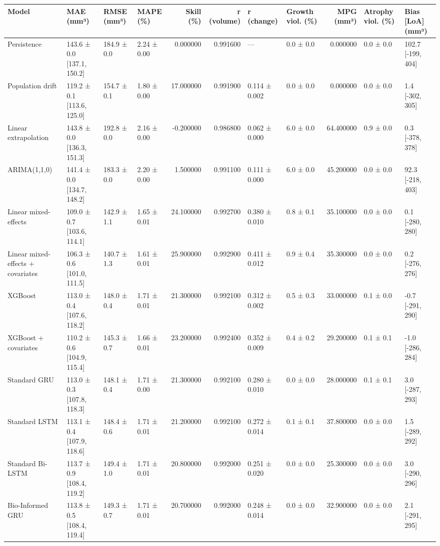 \begin{tabular}{llllrrllrll}
\toprule
Model & MAE (mm³) & RMSE (mm³) & MAPE (\%) & Skill (\%) & r (volume) & r (change) & Growth viol. (\%) & MPG (mm³) & Atrophy viol. (\%) & Bias [LoA] (mm³) \\
\midrule
Persistence & 143.6 ± 0.0 [137.1, 150.2] & 184.9 ± 0.0 & 2.24 ± 0.00 & 0.000000 & 0.991600 & — & 0.0 ± 0.0 & 0.000000 & 0.0 ± 0.0 & 102.7 [-199, 404] \\
Population drift & 119.2 ± 0.1 [113.6, 125.0] & 154.7 ± 0.1 & 1.80 ± 0.00 & 17.000000 & 0.991900 & 0.114 ± 0.002 & 0.0 ± 0.0 & 0.000000 & 0.0 ± 0.0 & 1.4 [-302, 305] \\
Linear extrapolation & 143.8 ± 0.0 [136.3, 151.3] & 192.8 ± 0.0 & 2.16 ± 0.00 & -0.200000 & 0.986800 & 0.062 ± 0.000 & 6.0 ± 0.0 & 64.400000 & 0.9 ± 0.0 & 0.3 [-378, 378] \\
ARIMA(1,1,0) & 141.4 ± 0.0 [134.7, 148.2] & 183.3 ± 0.0 & 2.20 ± 0.00 & 1.500000 & 0.991100 & 0.111 ± 0.000 & 6.0 ± 0.0 & 45.200000 & 0.0 ± 0.0 & 92.3 [-218, 403] \\
Linear mixed-effects & 109.0 ± 0.7 [103.6, 114.1] & 142.9 ± 1.1 & 1.65 ± 0.01 & 24.100000 & 0.992700 & 0.380 ± 0.010 & 0.8 ± 0.1 & 35.100000 & 0.0 ± 0.0 & 0.1 [-280, 280] \\
Linear mixed-effects + covariates & 106.3 ± 0.6 [101.0, 111.5] & 140.7 ± 1.3 & 1.61 ± 0.01 & 25.900000 & 0.992900 & 0.411 ± 0.012 & 0.9 ± 0.4 & 35.300000 & 0.0 ± 0.0 & 0.2 [-276, 276] \\
XGBoost & 113.0 ± 0.4 [107.6, 118.2] & 148.0 ± 0.4 & 1.71 ± 0.01 & 21.300000 & 0.992100 & 0.312 ± 0.002 & 0.5 ± 0.3 & 33.000000 & 0.1 ± 0.0 & -0.7 [-291, 290] \\
XGBoost + covariates & 110.2 ± 0.6 [104.9, 115.4] & 145.3 ± 0.7 & 1.66 ± 0.01 & 23.200000 & 0.992400 & 0.352 ± 0.009 & 0.4 ± 0.2 & 29.200000 & 0.1 ± 0.1 & -1.0 [-286, 284] \\
Standard GRU & 113.0 ± 0.3 [107.8, 118.3] & 148.1 ± 0.4 & 1.71 ± 0.00 & 21.300000 & 0.992100 & 0.280 ± 0.010 & 0.0 ± 0.0 & 28.000000 & 0.1 ± 0.1 & 3.0 [-287, 293] \\
Standard LSTM & 113.1 ± 0.4 [107.9, 118.6] & 148.4 ± 0.6 & 1.71 ± 0.01 & 21.200000 & 0.992100 & 0.272 ± 0.014 & 0.1 ± 0.1 & 37.800000 & 0.0 ± 0.0 & 1.5 [-289, 292] \\
Standard Bi-LSTM & 113.7 ± 0.9 [108.4, 119.2] & 149.4 ± 1.0 & 1.71 ± 0.01 & 20.800000 & 0.992000 & 0.251 ± 0.020 & 0.0 ± 0.0 & 25.300000 & 0.0 ± 0.0 & 3.0 [-290, 296] \\
Bio-Informed GRU & 113.8 ± 0.5 [108.4, 119.4] & 149.3 ± 0.7 & 1.71 ± 0.01 & 20.700000 & 0.992000 & 0.248 ± 0.014 & 0.0 ± 0.0 & 32.900000 & 0.0 ± 0.0 & 2.1 [-291, 295] \\

\end{tabular}
